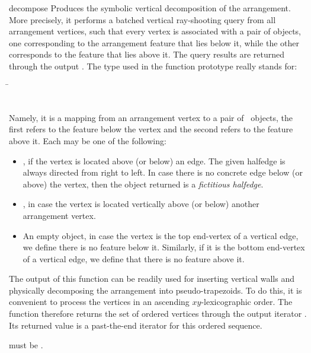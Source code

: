 \begin{ccRefFunction}{decompose}
Produces the symbolic vertical decomposition of the  arrangement.
More precisely, it performs a batched vertical ray-shooting query from all
arrangement vertices, such that every vertex is associated with a pair of
objects, one corresponding to the arrangement feature that lies below it,
while the other corresponds to the feature that lies above it. 
The query results are returned through the output . The
type  used in the function prototype really stands for:\\
\begin{tabbing}
\=\\
                 ~   \>
\end{tabbing}
Namely, it is a mapping from an arrangement vertex to a pair of
\cgal\ objects, the first refers to the feature below the vertex and
the second refers to the feature above it. Each  may be one of
the following:
\begin{itemize}
\item {}, if the vertex is located above (or
  below) an edge. The given halfedge is always directed from right to left.
  In case there is no concrete edge below (or above) the vertex, then
  the object returned is a {\em fictitious halfedge}.
\item {}, in case the vertex is located vertically
  above (or below) another arrangement vertex.
\item An empty object, in case the vertex is the top end-vertex of
  a vertical edge, we define there is no feature below it. Similarly, if
  it is the bottom end-vertex of a vertical edge, we define that there
  is no feature above it.
\end{itemize}
The output of this function can be readily used for inserting vertical walls
and physically decomposing the arrangement into pseudo-trapezoids. To do
this, it is convenient to process the vertices in an ascending
$xy$-lexicographic order. The function therefore returns the set of ordered
vertices through the output iterator . Its returned value is a
past-the-end iterator for this ordered sequence.

 must be
  .

\end{ccRefFunction}

\ccRefPageEnd
